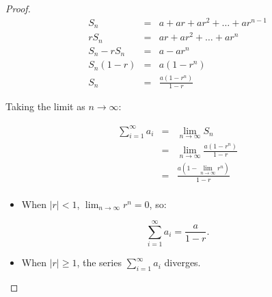 \documentclass[
]{book}
\providecommand{\tightlist}{%
  \setlength{\itemsep}{0pt}\setlength{\parskip}{0pt}}
\theoremstyle{definition}
\theoremstyle{definition}
\theoremstyle{definition}
\theoremstyle{definition}
\theoremstyle{remark}
\begin{document}
\begin{proof}

\begin{eqnarray}
S_n  &=& a + ar + ar^2 + \dots + ar^{n-1}\\
rS_n &=& ar + ar^2 + \dots + ar^n \\
S_n - rS_n &=& a - ar^n\\
S_n(1 - r) &=& a(1 - r^n)\\
S_n &=& \frac{a(1 - r^n)}{1 - r}
\end{eqnarray}

Taking the limit as \(n \to \infty\):

\begin{eqnarray}
\sum_{i=1}^\infty a_i 
&=& \lim_{n \to \infty} S_n\\
&=& \lim_{n \to \infty} \frac{a(1 - r^n)}{1 - r}\\
&=& \frac{a(1 - \lim_{n \to \infty} r^n)}{1 - r} \\
\end{eqnarray}

\begin{itemize}
\tightlist
\item
  When \(|r| < 1\), \(\lim_{n \to \infty} r^n = 0\), so:
\end{itemize}

\[
\sum_{i=1}^\infty a_i = \frac{a}{1 - r}.
\]

\begin{itemize}
\tightlist
\item
  When \(|r| \geq 1\), the series \(\sum_{i=1}^\infty a_i\) diverges.
\end{itemize}

\end{proof}
\end{document}
